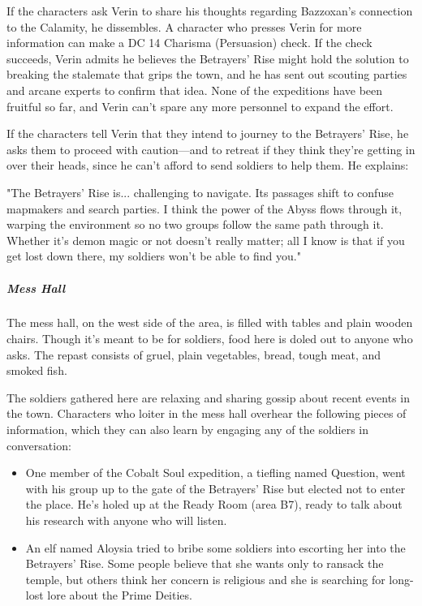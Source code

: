 \documentclass[10pt,a4paper,twoside,bg=print,twocolumn,openany,nodeprecatedcode]{dndbook}
\begin{document}
If the characters ask Verin to share his thoughts regarding Bazzoxan's connection to the Calamity, he dissembles. A character who presses Verin for more information can make a DC 14 Charisma (Persuasion) check. If the check succeeds, Verin admits he believes the Betrayers' Rise might hold the solution to breaking the stalemate that grips the town, and he has sent out scouting parties and arcane experts to confirm that idea. None of the expeditions have been fruitful so far, and Verin can't spare any more personnel to expand the effort.

If the characters tell Verin that they intend to journey to the Betrayers' Rise, he asks them to proceed with caution—and to retreat if they think they're getting in over their heads, since he can't afford to send soldiers to help them. He explains:

\begin{DndReadAloud}{}
"The Betrayers' Rise is... challenging to navigate. Its passages shift to confuse mapmakers and search parties. I think the power of the Abyss flows through it, warping the environment so no two groups follow the same path through it. Whether it's demon magic or not doesn't really matter; all I know is that if you get lost down there, my soldiers won't be able to find you."

\end{DndReadAloud}

\subparagraph{Mess Hall}
The mess hall, on the west side of the area, is filled with tables and plain wooden chairs. Though it's meant to be for soldiers, food here is doled out to anyone who asks. The repast consists of gruel, plain vegetables, bread, tough meat, and smoked fish.

The soldiers gathered here are relaxing and sharing gossip about recent events in the town. Characters who loiter in the mess hall overhear the following pieces of information, which they can also learn by engaging any of the soldiers in conversation:


\begin{itemize}
\item One member of the Cobalt Soul expedition, a tiefling named Question, went with his group up to the gate of the Betrayers' Rise but elected not to enter the place. He's holed up at the Ready Room (area B7), ready to talk about his research with anyone who will listen.
\item An elf named Aloysia tried to bribe some soldiers into escorting her into the Betrayers' Rise. Some people believe that she wants only to ransack the temple, but others think her concern is religious and she is searching for long-lost lore about the Prime Deities.
\end{itemize}
\end{document}
